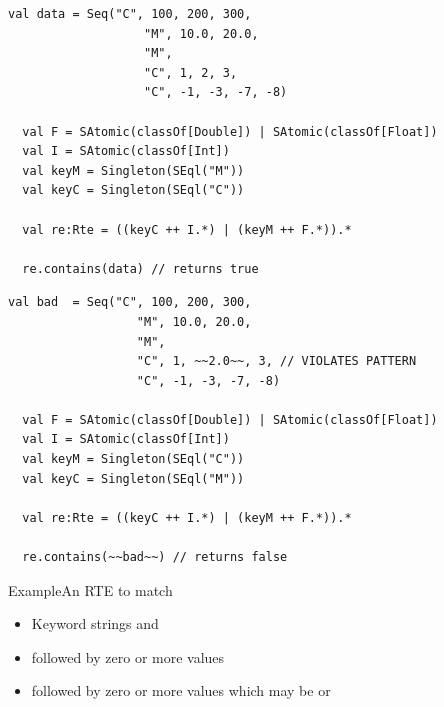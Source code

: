 \newsavebox\exampleAbbox
\begin{lrbox}{\exampleAbbox}
  \begin{minipage}{12cm}
\begin{lstlisting}[style=scalaioScala]
  val data = Seq("C", 100, 200, 300,
                   "M", 10.0, 20.0,
                   "M",
                   "C", 1, 2, 3,
                   "C", -1, -3, -7, -8)

  val F = SAtomic(classOf[Double]) | SAtomic(classOf[Float])
  val I = SAtomic(classOf[Int])
  val keyM = Singleton(SEql("M"))
  val keyC = Singleton(SEql("C"))

  val re:Rte = ((keyC ++ I.*) | (keyM ++ F.*)).*

  re.contains(data) // returns true
\end{lstlisting}
  \end{minipage}
\end{lrbox}

\newsavebox\exampleAcbox
\begin{lrbox}{\exampleAcbox}
  \begin{minipage}{12cm}
\begin{lstlisting}[style=scalaioScala]
  val bad  = Seq("C", 100, 200, 300,
                  "M", 10.0, 20.0,
                  "M",
                  "C", 1, ~~2.0~~, 3, // VIOLATES PATTERN
                  "C", -1, -3, -7, -8)

  val F = SAtomic(classOf[Double]) | SAtomic(classOf[Float])
  val I = SAtomic(classOf[Int])
  val keyM = Singleton(SEql("C"))
  val keyC = Singleton(SEql("M"))

  val re:Rte = ((keyC ++ I.*) | (keyM ++ F.*)).*

  re.contains(~~bad~~) // returns false
\end{lstlisting}
  \end{minipage}
\end{lrbox}



\begin{frame}{Example}{An RTE to match}
  \usebox\exampleAbox

  \begin{itemize}
  \item Keyword strings  and 
  \item {} followed by zero or more  values
  \item {} followed by zero or more values which may be  or 
  \end{itemize}
\end{frame}

